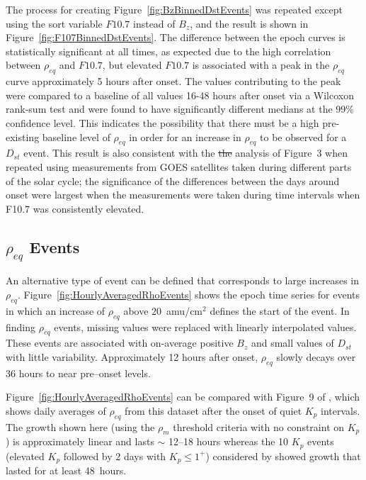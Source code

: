 \documentclass[12pt]{article}
\providecommand{\DIFdeltex}[1]{{\protect\color{red}\sout{#1}}}                      %
\providecommand{\DIFdelbegin}{} %
\providecommand{\DIFdelend}{} %
\providecommand{\DIFdel}[1]{\texorpdfstring{\DIFdeltex{#1}}{}} %
\begin{document}

The process for creating Figure~\ref{fig:BzBinnedDstEvents} was repeated except using the sort variable $F10.7$ instead of $B_z$, and the result is shown in Figure~\ref{fig:F107BinnedDstEvents}. The difference between the epoch curves is statistically significant at all times, as expected due to the high correlation between $\rho_{eq}$ and $F10.7$, but elevated $F10.7$ is associated with a peak in the $\rho_{eq}$ curve approximately 5 hours after onset. The values contributing to the peak were compared to a baseline of all values 16-48 hours after onset via a Wilcoxon rank-sum test and were found to have significantly different medians at the 99\% confidence level.  This indicates the possibility that there must be a high pre-existing baseline level of $\rho_{eq}$ in order for an increase in $\rho_{eq}$ to be observed for a $D_{st}$ event.  This result is also consistent with the \DIFdelbegin \DIFdel{the }\DIFdelend analysis of Figure~3 when repeated using measurements from GOES satellites taken during different parts of the solar cycle; the significance of the differences between the days around onset were largest when the measurements were taken during time intervals when F10.7 was consistently elevated.

\subsection{$\rho_{eq}$ Events}

An alternative type of event can be defined that corresponds to large increases in $\rho_{eq}$.  Figure~\ref{fig:HourlyAveragedRhoEvents} shows the epoch time series for events in which an increase of $\rho_{eq}$ above $20$~amu/cm$^2$ defines the start of the event. In finding $\rho_{eq}$ events, missing values were replaced with linearly interpolated values.  These events are associated with on-average positive $B_z$ and small values of $D_{st}$ with little variability.  Approximately 12 hours after onset, $\rho_{eq}$ slowly decays over 36 hours to near pre--onset levels.  

Figure~\ref{fig:HourlyAveragedRhoEvents} can be compared with Figure~9 of \cite{Denton2016}, which shows daily averages of $\rho_{eq}$ from this dataset after the onset of quiet $K_p$ intervals.  The growth shown here (using the $\rho_m$ threshold criteria with no constraint on $K_p$) is approximately linear and lasts $\sim$ 12--18 hours whereas the 10 $K_p$ events (elevated $K_p$ followed by 2 days with $K_p \le 1^+$) considered by \cite{Denton2016} showed growth that lasted for at least 48~hours. 
\end{document}
